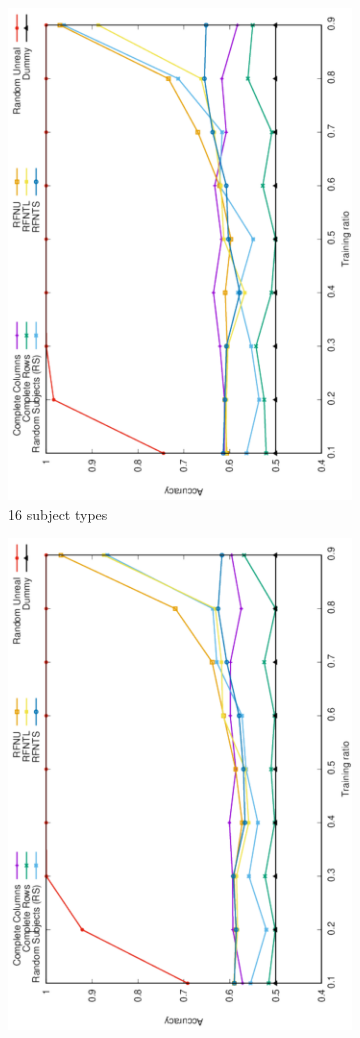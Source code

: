 \documentclass[10pt, conference, compsocconf]{IEEEtran}
\begin{document}
\begin{figure}
\begin{subfigure}[b]{0.4\linewidth}
        \includegraphics[width=0.8\columnwidth, angle=-90]{data/results/means_of_results/ALS/Synthetic/synthetic_subject_types/ALS-16-types.pdf}
        \caption{16 subject types}
\end{subfigure}
\begin{subfigure}[b]{0.4\linewidth}
        \includegraphics[width=0.8\columnwidth, angle=-90]{data/results/means_of_results/ALS/Synthetic/synthetic_subject_types/ALS-32-types.pdf}

\end{subfigure}
\end{figure}
\end{document}
